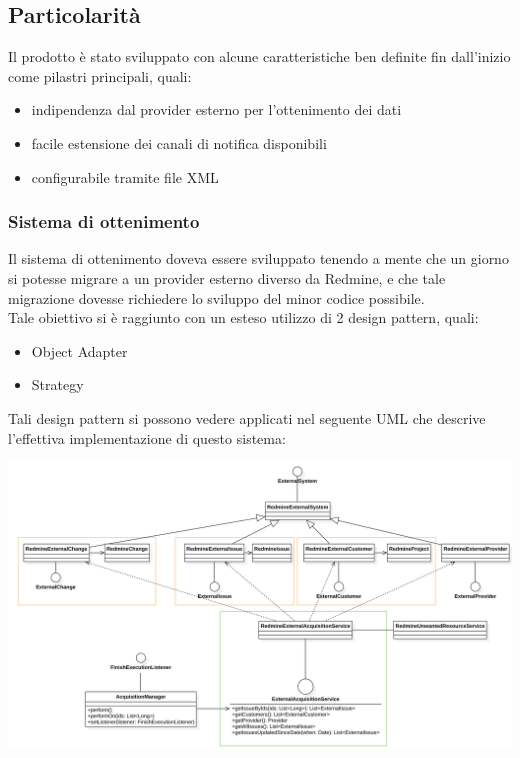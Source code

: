 	\subsection{Particolarità }
		Il prodotto è stato sviluppato con alcune caratteristiche ben definite fin dall'inizio come pilastri principali, quali:
		\begin{itemize}
			\item indipendenza dal provider esterno per l'ottenimento dei dati
			\item facile estensione dei canali di notifica disponibili
			\item configurabile tramite file XML
		\end{itemize}
		\subsubsection{Sistema di ottenimento}
			Il sistema di ottenimento doveva essere sviluppato tenendo a mente che un giorno si potesse migrare a un provider esterno diverso da Redmine, e che tale migrazione dovesse richiedere lo sviluppo del minor codice possibile. \\
			Tale obiettivo si è raggiunto con un esteso utilizzo di 2 design pattern, quali:
			\begin{itemize}
				\item Object Adapter
				\item Strategy
			\end{itemize}
			Tali design pattern si possono vedere applicati nel seguente UML che descrive l'effettiva implementazione di questo sistema:
   			\begin{center}
				\includegraphics[keepaspectratio = true, width=16cm]{immagini/ottenimento.png}
			\end{center}
